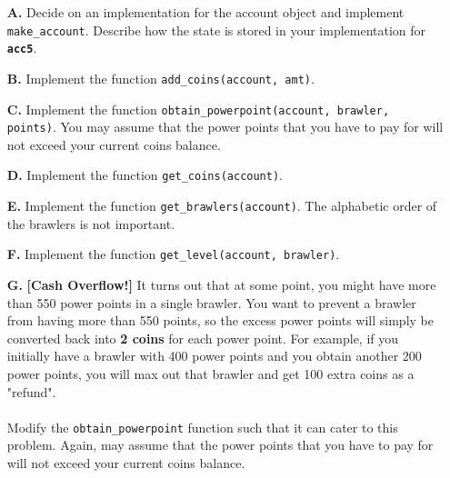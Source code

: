 \begin{enumerate}
\item[\textbf{A.}]
Decide on an implementation for the account object and implement \colorbox{CornflowerBlue!20}{\texttt{make\_account}}. 
Describe how the state is stored in your implementation for \texttt{\bfseries acc5}.
\begin{flushright}
    [3 marks]
\end{flushright}

\item[\textbf{B.}]
Implement the function \colorbox{CornflowerBlue!20}{\texttt{add\_coins(account, amt)}}.
\begin{flushright}
    [2 marks]
\end{flushright}

\item[\textbf{C.}]
Implement the function \colorbox{CornflowerBlue!20}{\texttt{obtain\_powerpoint(account, brawler, points)}}. You may assume that 
the power points that you have to pay for will not exceed your current coins balance.
\begin{flushright}
    [4 marks]
\end{flushright}

\item[\textbf{D.}]
Implement the function \colorbox{CornflowerBlue!20}{\texttt{get\_coins(account)}}.
\begin{flushright}
    [2 marks]
\end{flushright}

\item[\textbf{E.}]
Implement the function \colorbox{CornflowerBlue!20}{\texttt{get\_brawlers(account)}}. The alphabetic order of the brawlers is not important.
\begin{flushright}
    [3 marks]
\end{flushright}

\item[\textbf{F.}]   
Implement the function \colorbox{CornflowerBlue!20}{\texttt{get\_level(account, brawler)}}.
\begin{flushright}
    [3 marks]
\end{flushright}

\item[\textbf{G.}]   
\textbf{[Cash Overflow!]} It turns out that at some point, you might have more than 550 power points in a single brawler. 
You want to prevent a brawler from having more than 550 points, so the excess power points will simply be converted back into 
\textbf{2 coins} for each power point. For example, if you initially have a brawler with 400 power points and you obtain another 200 
power points, you will max out that brawler and get 100 extra coins as a "refund". \\ \\
Modify the \colorbox{CornflowerBlue!20}{\texttt{obtain\_powerpoint}} function such that it can cater to this problem. Again, may assume that 
the power points that you have to pay for will not exceed your current coins balance.
\begin{flushright}
    [4 marks]
\end{flushright}
\end{enumerate}

